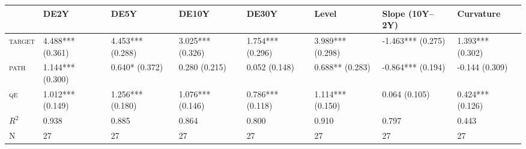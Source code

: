 \begin{tabular}{llllllll}
\toprule
 & DE2Y & DE5Y & DE10Y & DE30Y & Level & Slope (10Y--2Y) & Curvature \\
\midrule
\textsc{target} & 4.488*** (0.361) & 4.453*** (0.288) & 3.025*** (0.326) & 1.754*** (0.296) & 3.989*** (0.298) & -1.463*** (0.275) & 1.393*** (0.302) \\
\textsc{path} & 1.144*** (0.300) & 0.640* (0.372) & 0.280 (0.215) & 0.052 (0.148) & 0.688** (0.283) & -0.864*** (0.194) & -0.144 (0.309) \\
\textsc{qe} & 1.012*** (0.149) & 1.256*** (0.180) & 1.076*** (0.146) & 0.786*** (0.118) & 1.114*** (0.150) & 0.064 (0.105) & 0.424*** (0.126) \\
$R^2$ & 0.938 & 0.885 & 0.864 & 0.800 & 0.910 & 0.797 & 0.443 \\
N & 27 & 27 & 27 & 27 & 27 & 27 & 27 \\
\bottomrule
\end{tabular}
